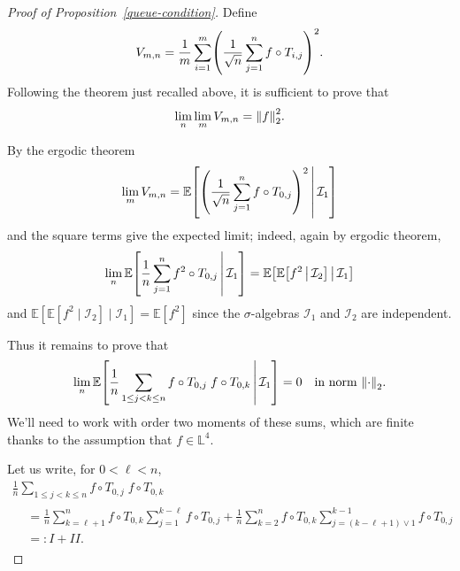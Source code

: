 \documentclass[10pt]{amsart}
\theoremstyle{definition}\newtheorem{defi}[theo]{Definition}\newtheorem{rema}[theo]{Remark}\newtheorem{exam}[theo]{Example}\newtheorem{exem}[theo]{Example}\newtheorem{nota}[theo]{Notation}
\newcommand*\bbL{\mathbb{L}}
\newcommand{\bbE}{\mathbb{E}}
\newcommand{\E}[1]{\bbE\left[#1\right]}
\newcommand*\I{\mathcal{I}}
\newcommand{\norm}[1]{\left\lVert #1\right\rVert}
\let\originalleft\left
\let\originalright\right
\renewcommand{\left}{\mathopen{}\mathclose\bgroup\originalleft}
\renewcommand{\right}{\aftergroup\egroup\originalright}
\begin{document}
\begin{proof}[Proof of Proposition~\ref{queue-condition}]
Define
\begin{equation}\label{eq:def_Vmn}
V_{m,n}=\frac 1m\sum_{i=1}^m \left(\frac 1{\sqrt n}\sum_{j=1}^n f\circ T_{i,j}\right)^2.
\end{equation}
Following the theorem just recalled above, it is sufficient to prove that
\[
\lim_{n}\lim_{m} V_{m,n}=\norm{f}_2^2.
\]

By the ergodic theorem
\[
\lim_m V_{m,n}= \E{\left(\frac 1{\sqrt n}\sum_{j=1}^n f\circ T_{0,j}\right)^2\,\middle|\,\I_1}
\]
and the square terms give the expected limit; indeed, again by ergodic theorem,
\[
\lim_n \E{\frac 1{n}\sum_{j=1}^n f^2\circ T_{0,j}\,\middle|\,\I_1}=\E{\E{f^2\,\middle|\,\I_2}\,\middle|\,\I_1}
\]
and $\bbE[\bbE[f^2\mid\I_2]\mid\I_1]=\bbE[f^2]$ since the $\sigma$-algebras $\I_1$ and $\I_2$ are independent.

Thus it remains to prove that
\begin{equation}\label{eq:termes-croises}
\lim_n\E{\frac1n\sum_{1\leq j< k\leq n}f\circ T_{0,j}\;f\circ T_{0,k}\,\middle|\,\I_1} =0\quad\text{in norm }\norm{\cdot}_2.
\end{equation}
We'll need to work with order two moments of these sums, which are finite thanks to the assumption that $f\in\bbL^4$.

Let us write, for $0<\ell<n$,
\begin{multline*}
\frac1n\sum_{1\leq j< k\leq n}f\circ T_{0,j}\;f\circ T_{0,k} \\
\begin{aligned}
&=
\frac1n \sum_{k=\ell+1}^{n} f \circ T_{0,k}
\sum_{j=1}^{k-\ell} f \circ T_{0,j} +
\frac1n \sum_{k=2}^{n} f \circ T_{0,k}
\sum_{j=(k-\ell+1)\vee 1}^{k-1} f \circ T_{0,j}\\
&=: I + II.
\end{aligned}
\end{multline*}


\end{proof}
\end{document}
